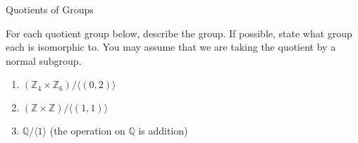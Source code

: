 \begin{section}{Quotients of Groups}
\begin{problem}
For each quotient group below, describe the group.  If possible, state what group each is isomorphic to.  You may assume that we are taking the quotient by a normal subgroup. 
\begin{enumerate}[label=\rm{(\alph*)}]
\item $(\mathbb{Z}_4\times \mathbb{Z}_6)/\langle (0,2)\rangle$
\item $(\mathbb{Z}\times \mathbb{Z})/\langle (1,1)\rangle$
\item $\mathbb{Q}/\langle 1\rangle$ (the operation on $\mathbb{Q}$ is addition)
\end{enumerate}
\end{problem}

\end{section}